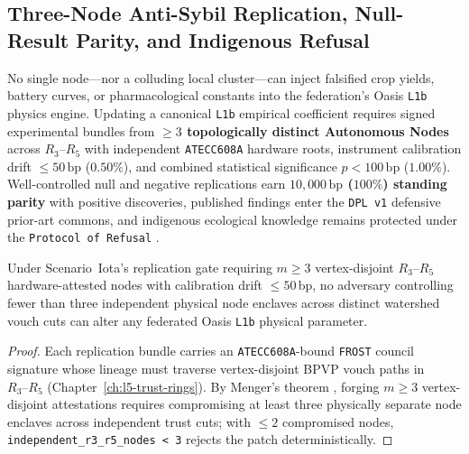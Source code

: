 \subsection{Three-Node Anti-Sybil Replication, Null-Result Parity, and Indigenous Refusal}

No single node---nor a colluding local cluster---can inject falsified crop yields, battery curves,
or pharmacological constants into the federation's Oasis \texttt{L1b} physics engine. Updating a
canonical \texttt{L1b} empirical coefficient requires signed experimental bundles from \textbf{$\ge 3$
topologically distinct Autonomous Nodes} across $R_3\text{--}R_5$ with independent \texttt{ATECC608A}
hardware roots, instrument calibration drift $\le 50\,\mathrm{bp}$ ($0.50\%$), and combined
statistical significance $p < 100\,\mathrm{bp}$ ($1.00\%$). Well-controlled null and negative
replications earn \textbf{$10{,}000\,\mathrm{bp}$ ($100\%$) standing parity} with positive discoveries,
published findings enter the \texttt{DPL v1} defensive prior-art commons, and indigenous ecological
knowledge remains protected under the \texttt{Protocol of Refusal} \parencite{kimmerer2013}.

\begin{theorem}
\label{thm:wavee-iota-replication}
Under Scenario~Iota's replication gate requiring $m \ge 3$ vertex-disjoint $R_3\text{--}R_5$
hardware-attested nodes with calibration drift $\le 50\,\mathrm{bp}$, no adversary controlling fewer
than three independent physical node enclaves across distinct watershed vouch cuts can alter any
federated Oasis \texttt{L1b} physical parameter.
\end{theorem}
\begin{proof}
Each replication bundle carries an \texttt{ATECC608A}-bound \texttt{FROST} council signature whose
lineage must traverse vertex-disjoint BPVP vouch paths in $R_3\text{--}R_5$ (Chapter~\ref{ch:l5-trust-rings}).
By Menger's theorem \parencite{ford1956maximal}, forging $m \ge 3$ vertex-disjoint attestations
requires compromising at least three physically separate node enclaves across independent trust cuts;
with $\le 2$ compromised nodes, \texttt{independent\_r3\_r5\_nodes < 3} rejects the patch deterministically.
\end{proof}

